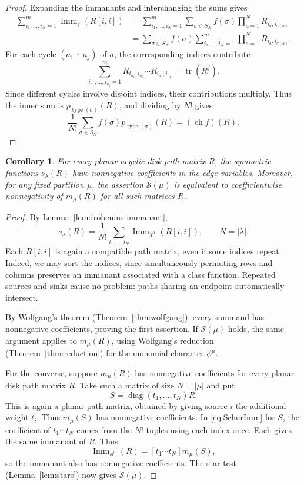 \documentclass[11pt]{article}
\newtheorem{corollary}[theorem]{Corollary}
\theoremstyle{definition}
\theoremstyle{remark}
\newcommand{\type}{\operatorname{type}}
\newcommand{\tr}{\operatorname{tr}}
\newcommand{\Imm}{\operatorname{Imm}}
\newcommand{\ch}{\operatorname{ch}}
\begin{document}
\begin{proof}
Expanding the immanants and interchanging the sums gives
\[
\begin{aligned}
\sum_{i_1,\ldots,i_N=1}^m \Imm_f(R[i,i])
&=\sum_{i_1,\ldots,i_N=1}^m
  \sum_{\sigma\in S_N}f(\sigma)
  \prod_{a=1}^N R_{i_a,i_{\sigma(a)}}\\
&=\sum_{\sigma\in S_N}f(\sigma)
  \sum_{i_1,\ldots,i_N=1}^m
  \prod_{a=1}^N R_{i_a,i_{\sigma(a)}}.
\end{aligned}
\]
For each cycle $(a_1\,\cdots\,a_j)$ of $\sigma$,
the corresponding indices contribute
\[
\sum_{i_{a_1},\ldots,i_{a_j}=1}^m
R_{i_{a_1},i_{a_2}}\cdots R_{i_{a_j},i_{a_1}}
=\tr(R^j).
\]
Since different cycles involve disjoint indices,
their contributions multiply. Thus the inner sum
is $p_{\type(\sigma)}(R)$, and dividing by $N!$
gives 
\[
\frac1{N!}\sum_{\sigma\in S_N}
f(\sigma)p_{\type(\sigma)}(R)
=(\ch f)(R).
\]
\end{proof}



\begin{corollary}\label{cor:pathschur}
For every planar acyclic disk path matrix $R$,
the symmetric functions $s_\lambda(R)$ have
nonnegative coefficients in the edge variables.
Moreover, for any fixed partition $\mu$,
the assertion $\mathcal S(\mu)$ is equivalent
to coefficientwise nonnegativity of $m_\mu(R)$
for all such matrices $R$.
\end{corollary}

\begin{proof}
By Lemma~\ref{lem:frobenius-immanant},
\[
s_\lambda(R)=\frac1{N!}
\sum_{i_1,\ldots,i_N}
\Imm_{\chi^\lambda}(R[i,i]),
\qquad N=|\lambda|.
\]
Each $R[i,i]$ is again a compatible path matrix,
even if some indices repeat. Indeed, we may sort
the indices, since simultaneously permuting
rows and columns preserves an immanant associated
with a class function. Repeated sources and sinks
cause no problem: paths sharing an endpoint
automatically intersect.

By Wolfgang's theorem
(Theorem~\ref{thm:wolfgang}), every summand has
nonnegative coefficients, proving the first
assertion. If $\mathcal S(\mu)$ holds, the same
argument applies to $m_\mu(R)$, using Wolfgang's
reduction (Theorem~\ref{thm:reduction}) for the
monomial character $\phi^\mu$.

For the converse, suppose $m_\mu(R)$ has
nonnegative coefficients for every planar
disk path matrix $R$. Take such a matrix of
size $N=|\mu|$ and put
\[
S=\operatorname{diag}(t_1,\ldots,t_N)R.
\]
This is again a planar path matrix, obtained
by giving source $i$ the additional weight $t_i$.
Thus $m_\mu(S)$ has nonnegative coefficients.
In \eqref{eq:SchurImm} for $S$, the coefficient of
$t_1\cdots t_N$ comes from the $N!$ tuples using each
index once. Each gives the same immanant of $R$. Thus
\[
\Imm_{\phi^\mu}(R)
=[t_1\cdots t_N]m_\mu(S),
\]
so the immanant also has nonnegative coefficients.
The star test (Lemma~\ref{lem:stars}) now gives
$\mathcal S(\mu)$.
\end{proof}
\end{document}

